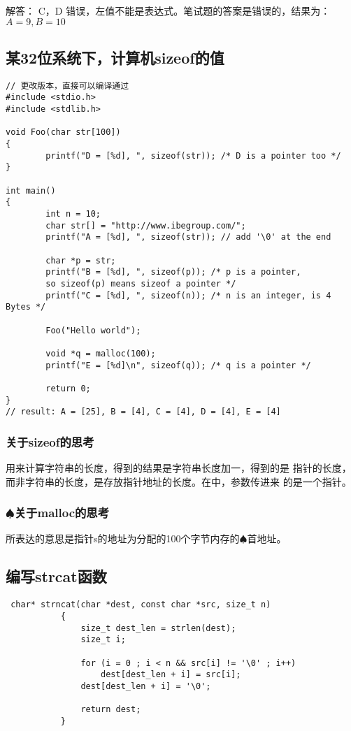 \documentclass{article}
\begin{document}
\textsf{解答：} C，D 错误，左值不能是表达式。笔试题的答案是错误的，结果为：$A = 9, B = 10$

\subsection{某32位系统下，计算机sizeof的值}
\begin{verbatim}
// 更改版本，直接可以编译通过
#include <stdio.h>
#include <stdlib.h>

void Foo(char str[100]) 
{
        printf("D = [%d], ", sizeof(str)); /* D is a pointer too */
}

int main()
{
        int n = 10; 
        char str[] = "http://www.ibegroup.com/";
        printf("A = [%d], ", sizeof(str)); // add '\0' at the end

        char *p = str;
        printf("B = [%d], ", sizeof(p)); /* p is a pointer,
		so sizeof(p) means sizeof a pointer */
        printf("C = [%d], ", sizeof(n)); /* n is an integer, is 4 Bytes */

        Foo("Hello world");
    
        void *q = malloc(100);
        printf("E = [%d]\n", sizeof(q)); /* q is a pointer */

        return 0;
}
// result: A = [25], B = [4], C = [4], D = [4], E = [4] 
\end{verbatim}
\subsubsection{关于sizeof的思考}
用来计算字符串的长度，得到的结果是字符串长度加一，得到的是
指针的长度，而非字符串的长度，是存放指针地址的长度。在中，参数传进来
的是一个指针。
\subsubsection{$\spadesuit$关于malloc的思考}
所表达的意思是指针s的地址为分配的100个字节内存的$\spadesuit$首地址。

\subsection{编写strcat函数}
\begin{verbatim}
 char* strncat(char *dest, const char *src, size_t n)
           {
               size_t dest_len = strlen(dest);
               size_t i;

               for (i = 0 ; i < n && src[i] != '\0' ; i++)
                   dest[dest_len + i] = src[i];
               dest[dest_len + i] = '\0';

               return dest;
           }

\end{verbatim}
\end{document}
